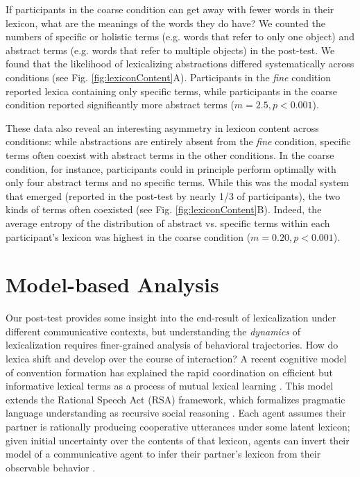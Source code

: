 \documentclass[10pt,letterpaper]{article}
\begin{document}
If participants in the coarse condition can get away with fewer words in their lexicon, what are the meanings of the words they do have? We counted the numbers of specific or holistic terms (e.g. words that refer to only one object) and abstract terms (e.g. words that refer to multiple objects) in the post-test. We found that the likelihood of lexicalizing abstractions differed systematically across conditions (see Fig. \ref{fig:lexiconContent}A). Participants in the \emph{fine} condition reported lexica containing only specific terms, while participants in the coarse condition reported significantly more abstract terms ($m = 2.5, p < 0.001$). 

These data also reveal an interesting asymmetry in lexicon content across conditions: while abstractions are entirely absent from the \emph{fine} condition, specific terms often coexist with abstract terms in the other conditions. In the coarse condition, for instance, participants could in principle perform optimally with only four abstract terms and no specific terms. While this was the modal system that emerged (reported in the post-test by nearly 1/3 of participants), the two kinds of terms often coexisted (see Fig. \ref{fig:lexiconContent}B). Indeed, the average entropy of the distribution of abstract vs. specific terms within each participant's lexicon was highest in the coarse condition ($m = 0.20, p < 0.001$).

\section{Model-based Analysis}

Our post-test provides some insight into the end-result of lexicalization under different communicative contexts, but understanding the \emph{dynamics} of lexicalization requires finer-grained analysis of behavioral trajectories. How do lexica shift and develop over the course of interaction? A recent cognitive model of convention formation has explained the rapid coordination on efficient but informative lexical terms as a process of mutual lexical learning \cite{HawkinsFrankGoodman17_ConventionFormation}. This model extends the Rational Speech Act (RSA) framework, which formalizes pragmatic language understanding as recursive social reasoning \cite{FrankGoodman12_PragmaticReasoningLanguageGames,GoodmanFrank16_RSATiCS}. Each agent assumes their partner is rationally producing cooperative utterances under some latent lexicon; given initial uncertainty over the contents of that lexicon, agents can invert their model of a communicative agent to infer their partner's lexicon from their observable behavior \cite{BergenLevyGoodman16_LexicalUncertainty}. 
\end{document}
